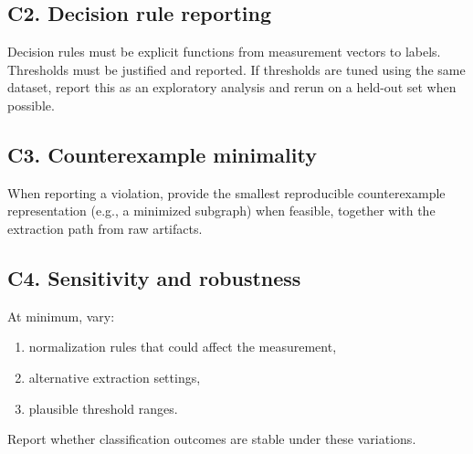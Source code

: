 \subsection*{C2. Decision rule reporting}
Decision rules must be explicit functions from measurement vectors to labels. Thresholds must be justified and reported. If thresholds are tuned using the same dataset, report this as an exploratory analysis and rerun on a held-out set when possible.

\subsection*{C3. Counterexample minimality}
When reporting a violation, provide the smallest reproducible counterexample representation (e.g., a minimized subgraph) when feasible, together with the extraction path from raw artifacts.

\subsection*{C4. Sensitivity and robustness}
At minimum, vary:
\begin{enumerate}[leftmargin=*]
  \item normalization rules that could affect the measurement,
  \item alternative extraction settings,
  \item plausible threshold ranges.
\end{enumerate}
Report whether classification outcomes are stable under these variations.
